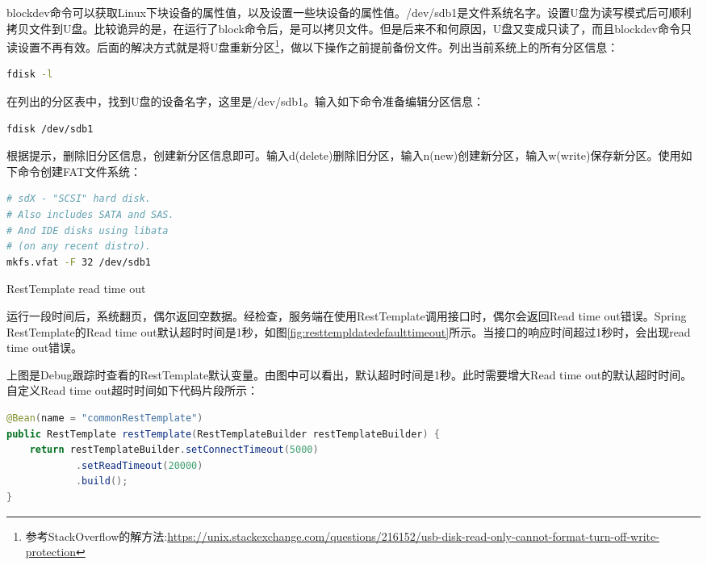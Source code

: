 \documentclass[8pt]{book}
\makeatletter
\numberwithin{dummy}{section}
\theoremstyle{ocrenumbox}
\theoremstyle{blacknumex}
\theoremstyle{blacknumbox}
\theoremstyle{ocrenum}
\renewcommand{\subsection}{\@startsection {subsection}{2}{\z@}
	{-3ex \@plus -0.1ex \@minus -.4ex}
	{0.5ex \@plus.2ex }
	{\normalfont\sffamily\bfseries}}
\makeatother
\begin{document}
blockdev命令可以获取Linux下块设备的属性值，以及设置一些块设备的属性值。/dev/sdb1是文件系统名字。设置U盘为读写模式后可顺利拷贝文件到U盘。比较诡异的是，在运行了block命令后，是可以拷贝文件。但是后来不和何原因，U盘又变成只读了，而且blockdev命令只读设置不再有效。后面的解决方式就是将U盘重新分区\footnote{参考StackOverflow的解方法:\url{https://unix.stackexchange.com/questions/216152/usb-disk-read-only-cannot-format-turn-off-write-protection}}，做以下操作之前提前备份文件。列出当前系统上的所有分区信息：

\begin{lstlisting}[language=Bash]
fdisk -l
\end{lstlisting}

在列出的分区表中，找到U盘的设备名字，这里是/dev/sdb1。输入如下命令准备编辑分区信息：

\begin{lstlisting}[language=Bash]
fdisk /dev/sdb1
\end{lstlisting}

根据提示，删除旧分区信息，创建新分区信息即可。输入d(delete)删除旧分区，输入n(new)创建新分区，输入w(write)保存新分区。使用如下命令创建FAT文件系统：

\begin{lstlisting}[language=Bash]
# sdX - "SCSI" hard disk. 
# Also includes SATA and SAS. 
# And IDE disks using libata 
# (on any recent distro).
mkfs.vfat -F 32 /dev/sdb1
\end{lstlisting}

\subsection{RestTemplate read time out}

运行一段时间后，系统翻页，偶尔返回空数据。经检查，服务端在使用RestTemplate调用接口时，偶尔会返回Read time out错误。Spring RestTemplate的Read time out默认超时时间是1秒，如图\ref{fig:resttempldatedefaulttimeout}所示。当接口的响应时间超过1秒时，会出现read time out错误。



上图是Debug跟踪时查看的RestTemplate默认变量。由图中可以看出，默认超时时间是1秒。此时需要增大Read time out的默认超时时间。自定义Read time out超时时间如下代码片段所示：

\begin{lstlisting}[language=Java]
@Bean(name = "commonRestTemplate")
public RestTemplate restTemplate(RestTemplateBuilder restTemplateBuilder) {
	return restTemplateBuilder.setConnectTimeout(5000)
			.setReadTimeout(20000)
			.build();
}
\end{lstlisting}
\end{document}
